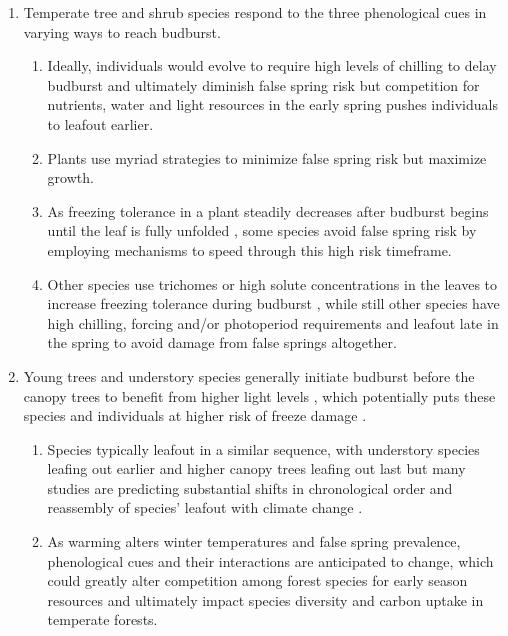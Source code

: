 \documentclass{article}\usepackage[]{graphicx}\usepackage[]{color}
\begin{document}
\begin{enumerate}
\item Temperate tree and shrub species respond to the three phenological cues in varying ways to reach budburst.
  \begin{enumerate} %
  \item Ideally, individuals would evolve to require high levels of chilling to delay budburst and ultimately diminish false spring risk but competition for nutrients, water and light resources in the early spring pushes individuals to leafout earlier.
  \item Plants use myriad strategies to minimize false spring risk but maximize growth.
  \item As freezing tolerance in a plant steadily decreases after budburst begins until the leaf is fully unfolded \citep{Lenz2016}, some species avoid false spring risk by employing mechanisms to speed through this high risk timeframe.
  \item Other species use trichomes or high solute concentrations in the leaves to increase freezing tolerance during budburst \citep{Agrawal2004, Sakai1987}, while still other species have high chilling, forcing and/or photoperiod requirements and leafout late in the spring to avoid damage from false springs altogether.
  \end{enumerate}
  
\item Young trees and understory species generally initiate budburst before the canopy trees to benefit from higher light levels \citep {Augspurger2008, Vitasse2013}, which potentially puts these species and individuals at higher risk of freeze damage \citep{Vitasse2014}.
  \begin{enumerate}
  \item Species typically leafout in a similar sequence, with understory species leafing out earlier and higher canopy trees leafing out last but many studies are predicting substantial shifts in chronological order and reassembly of species' leafout with climate change \citep{Roberts2015, Laube2014}.
  \item As warming alters winter temperatures and false spring prevalence, phenological cues and their interactions are anticipated to change, which could greatly alter competition among forest species for early season resources and ultimately impact species diversity and carbon uptake in temperate forests.
  \end{enumerate}
  

\end{enumerate}
\end{document}
